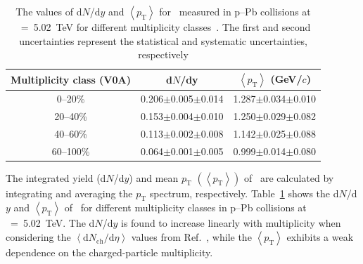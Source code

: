 \begin{table}[h!]
\caption{The values of d$N$/d$y$ and $\left\langle p_{\mathrm{T}} \right\rangle$ for \fzero~measured in p--Pb collisions at \snn~=~5.02~TeV for different multiplicity classes~\cite{ALICE:2012xs}. The first and second uncertainties represent the statistical and systematic uncertainties, respectively}
\centering
\begin{tabular}{ccc}
\hline 
Multiplicity class (V0A) & d$N$/dy & $\left\langle p_{\mathrm{T}} \right\rangle$ (GeV/$c$) \\ \hline
0--20\% & 0.206$\pm$0.005$\pm$0.014 & 1.287$\pm$0.034$\pm$0.010 \\
20--40\% & 0.153$\pm$0.004$\pm$0.010 & 1.250$\pm$0.029$\pm$0.082 \\
40--60\% & 0.113$\pm$0.002$\pm$0.008 & 1.142$\pm$0.025$\pm$0.088 \\
60--100\% & 0.064$\pm$0.001$\pm$0.005 & 0.999$\pm$0.014$\pm$0.080 \\
\hline
\end{tabular}
\label{tab:ymp}
\end{table}

The integrated yield (d$N$/d$y$) and mean $p_{\mathrm{T}}$ $\left( \left\langle p_{\mathrm{T}} \right\rangle \right)$ of \fzero~are calculated by integrating and averaging the $p_{\mathrm{T}}$ spectrum, respectively. Table~\ref{tab:ymp} shows the d$N$/d$y$ and $ \left\langle p_{\mathrm{T}} \right\rangle$ of \fzero~for different multiplicity classes in p--Pb collisions at \snn~=~5.02~TeV. The d$N$/d$y$ is found to increase linearly with multiplicity when considering the $\left\langle \mathrm{d}N_{\mathrm{ch}}/\mathrm{d}\eta \right\rangle$ values from Ref.~\cite{ALICE:2012xs}, while the $\left\langle p_{\mathrm{T}} \right\rangle$ exhibits a weak dependence on the charged-particle multiplicity. 

